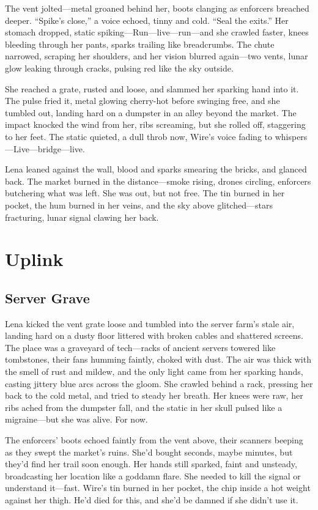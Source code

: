 \documentclass[12pt]{book}
\begin{document}
The vent jolted—metal groaned behind her, boots clanging as enforcers breached deeper. “Spike’s close,” a voice echoed, tinny and cold. “Seal the exits.” Her stomach dropped, static spiking—Run—live—run—and she crawled faster, knees bleeding through her pants, sparks trailing like breadcrumbs. The chute narrowed, scraping her shoulders, and her vision blurred again—two vents, lunar glow leaking through cracks, pulsing red like the sky outside.

She reached a grate, rusted and loose, and slammed her sparking hand into it. The pulse fried it, metal glowing cherry-hot before swinging free, and she tumbled out, landing hard on a dumpster in an alley beyond the market. The impact knocked the wind from her, ribs screaming, but she rolled off, staggering to her feet. The static quieted, a dull throb now, Wire’s voice fading to whispers—Live—bridge—live.

Lena leaned against the wall, blood and sparks smearing the bricks, and glanced back. The market burned in the distance—smoke rising, drones circling, enforcers butchering what was left. She was out, but not free. The tin burned in her pocket, the hum burned in her veins, and the sky above glitched—stars fracturing, lunar signal clawing her back.

\chapter{Uplink}

\section{Server Grave}

Lena kicked the vent grate loose and tumbled into the server farm’s stale air, landing hard on a dusty floor littered with broken cables and shattered screens. The place was a graveyard of tech---racks of ancient servers towered like tombstones, their fans humming faintly, choked with dust. The air was thick with the smell of rust and mildew, and the only light came from her sparking hands, casting jittery blue arcs across the gloom. She crawled behind a rack, pressing her back to the cold metal, and tried to steady her breath. Her knees were raw, her ribs ached from the dumpster fall, and the static in her skull pulsed like a migraine---but she was alive. For now.

The enforcers’ boots echoed faintly from the vent above, their scanners beeping as they swept the market’s ruins. She’d bought seconds, maybe minutes, but they’d find her trail soon enough. Her hands still sparked, faint and unsteady, broadcasting her location like a goddamn flare. She needed to kill the signal or understand it---fast. Wire’s tin burned in her pocket, the chip inside a hot weight against her thigh. He’d died for this, and she’d be damned if she didn’t use it.
\end{document}
